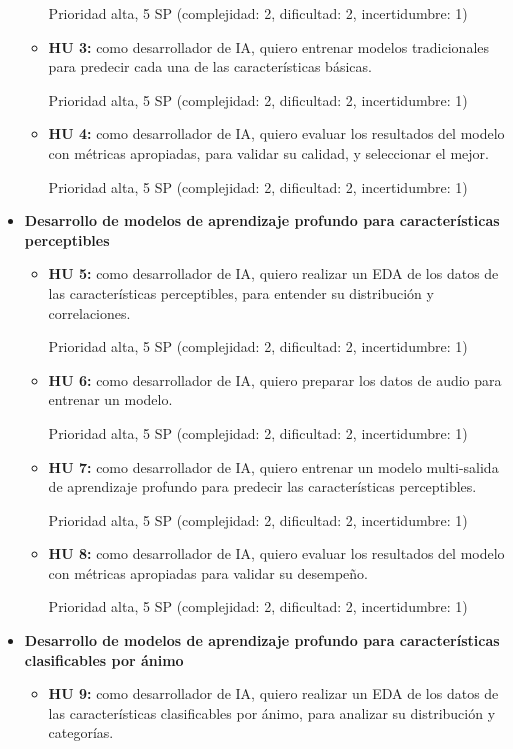 \documentclass[
11pt, %
]{charter}
\begin{document}
\begin{itemize}
\begin{itemize}
      Prioridad alta, 5 SP (complejidad: 2, dificultad: 2, incertidumbre: 1)
      \item \textbf{HU 3:}
      como desarrollador de IA, quiero entrenar modelos tradicionales para predecir cada una de las características básicas.
      
      Prioridad alta, 5 SP (complejidad: 2, dificultad: 2, incertidumbre: 1)
      \item \textbf{HU 4:}
      como desarrollador de IA, quiero evaluar los resultados del modelo con métricas apropiadas, para validar su calidad, y seleccionar el mejor.
      
      Prioridad alta, 5 SP (complejidad: 2, dificultad: 2, incertidumbre: 1)
    \end{itemize}
  \item \textbf{Desarrollo de modelos de aprendizaje profundo para características perceptibles}
    \begin{itemize}
      \item \textbf{HU 5:}
      como desarrollador de IA, quiero realizar un EDA de los datos de las características perceptibles, para entender su distribución y correlaciones.
      
      Prioridad alta, 5 SP (complejidad: 2, dificultad: 2, incertidumbre: 1)
      \item \textbf{HU 6:}
      como desarrollador de IA, quiero preparar los datos de audio para entrenar un modelo.
      
      Prioridad alta, 5 SP (complejidad: 2, dificultad: 2, incertidumbre: 1)
      \item \textbf{HU 7:}
      como desarrollador de IA, quiero entrenar un modelo multi-salida de aprendizaje profundo para predecir las características perceptibles.
      
      Prioridad alta, 5 SP (complejidad: 2, dificultad: 2, incertidumbre: 1)
      \item \textbf{HU 8:}
      como desarrollador de IA, quiero evaluar los resultados del modelo con métricas apropiadas para validar su desempeño.
      
      Prioridad alta, 5 SP (complejidad: 2, dificultad: 2, incertidumbre: 1)
      
    \end{itemize}
  \item \textbf{Desarrollo de modelos de aprendizaje profundo para características clasificables por ánimo}
    \begin{itemize}
      \item \textbf{HU 9:}
      como desarrollador de IA, quiero realizar un EDA de los datos de las características clasificables por ánimo, para analizar su distribución y categorías.
      

\end{itemize}
\end{itemize}
\end{document}
